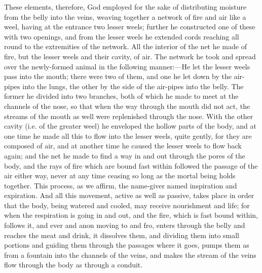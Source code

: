\documentclass[11pt,letter]{article}
\begin{document}
\par  These elements, therefore, God employed for the sake of distributing moisture from the belly into the veins, weaving together a network of fire and air like a weel, having at the entrance two lesser weels; further he constructed one of these with two openings, and from the lesser weels he extended cords reaching all round to the extremities of the network. All the interior of the net he made of fire, but the lesser weels and their cavity, of air. The network he took and spread over the newly-formed animal in the following manner:—He let the lesser weels pass into the mouth; there were two of them, and one he let down by the air-pipes into the lungs, the other by the side of the air-pipes into the belly. The former he divided into two branches, both of which he made to meet at the channels of the nose, so that when the way through the mouth did not act, the streams of the mouth as well were replenished through the nose. With the other cavity (i.e. of the greater weel) he enveloped the hollow parts of the body, and at one time he made all this to flow into the lesser weels, quite gently, for they are composed of air, and at another time he caused the lesser weels to flow back again; and the net he made to find a way in and out through the pores of the body, and the rays of fire which are bound fast within followed the passage of the air either way, never at any time ceasing so long as the mortal being holds together. This process, as we affirm, the name-giver named inspiration and expiration. And all this movement, active as well as passive, takes place in order that the body, being watered and cooled, may receive nourishment and life; for when the respiration is going in and out, and the fire, which is fast bound within, follows it, and ever and anon moving to and fro, enters through the belly and reaches the meat and drink, it dissolves them, and dividing them into small portions and guiding them through the passages where it goes, pumps them as from a fountain into the channels of the veins, and makes the stream of the veins flow through the body as through a conduit.
\end{document}
